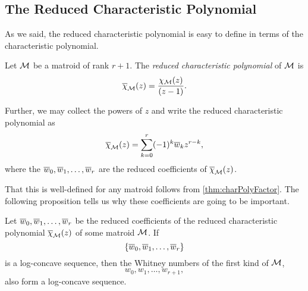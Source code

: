 \documentclass[12pt,oneside]{../../sfsuthesis}
\begin{document}
\subsection{The Reduced Characteristic Polynomial}
As we said, the reduced characteristic polynomial is easy to define in terms of the characteristic polynomial.
\begin{definition}\label{def:reducedCharPoly}
    Let \( \mathcal{M} \) be a matroid of rank \( r + 1 \).
    The \emph{reduced characteristic polynomial} of \( \mathcal{M} \) is
    \[
        \overline{\chi}_{\mathcal{M}}(z) = \frac{\chi_{\mathcal{M}}(z)}{(z-1)}.
    \]

    Further, we may collect the powers of \( z \) and write the reduced characteristic polynomial as
    \[
        \overline{\chi}_{\mathcal{M}}(z) = \sum_{k=0}^r (-1)^k\overline{w}_k z^{r-k},
    \]
    where the \( \overline{w}_0, \overline{w}_1, \dots, \overline{w}_r \) are the reduced coefficients of \( \overline{\chi}_{\mathcal{M}}(z) \).
\end{definition}
That this is well-defined for any matroid follows from \th\ref{thm:charPolyFactor}.
The following proposition tells us why these coefficients are going to be important.
\begin{lemma}\th\label{reducedImpliesOriginal}
    Let  \( \overline{w}_0, \overline{w}_1, \dots, \overline{w}_r \) be the reduced coefficients of the reduced characteristic polynomial \( \overline{\chi}_{\mathcal{M}}(z) \) of some matroid \( \mathcal{M} \).
    If
    \[
        \{\overline{w}_0, \overline{w}_1, \dots, \overline{w}_r \}
    \]
    is a log-concave sequence, then the Whitney numbers of the first kind of \( \mathcal{M} \),
    \[
        w_0, w_1, \dots, w_{r+1},
    \]
    also form a log-concave sequence.
\end{lemma}
\end{document}
